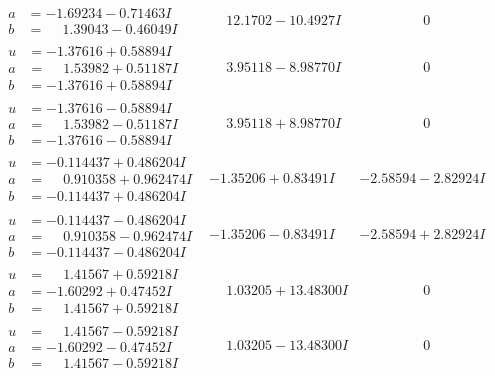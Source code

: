 \documentclass[1p]{elsarticle_modified}
\theoremstyle{definition}
\begin{document}
$$\begin{array}{c|c|c}
\begin{aligned}
a &= -1.69234 - 0.71463 I \\
b &= \phantom{-}1.39043 - 0.46049 I\end{aligned}
 & \phantom{-}12.1702 - 10.4927 I & \phantom{-0.000000 } 0 \\ \hline\begin{aligned}
u &= -1.37616 + 0.58894 I \\
a &= \phantom{-}1.53982 + 0.51187 I \\
b &= -1.37616 + 0.58894 I\end{aligned}
 & \phantom{-}3.95118 - 8.98770 I & \phantom{-0.000000 } 0 \\ \hline\begin{aligned}
u &= -1.37616 - 0.58894 I \\
a &= \phantom{-}1.53982 - 0.51187 I \\
b &= -1.37616 - 0.58894 I\end{aligned}
 & \phantom{-}3.95118 + 8.98770 I & \phantom{-0.000000 } 0 \\ \hline\begin{aligned}
u &= -0.114437 + 0.486204 I \\
a &= \phantom{-}0.910358 + 0.962474 I \\
b &= -0.114437 + 0.486204 I\end{aligned}
 & -1.35206 + 0.83491 I & -2.58594 - 2.82924 I \\ \hline\begin{aligned}
u &= -0.114437 - 0.486204 I \\
a &= \phantom{-}0.910358 - 0.962474 I \\
b &= -0.114437 - 0.486204 I\end{aligned}
 & -1.35206 - 0.83491 I & -2.58594 + 2.82924 I \\ \hline\begin{aligned}
u &= \phantom{-}1.41567 + 0.59218 I \\
a &= -1.60292 + 0.47452 I \\
b &= \phantom{-}1.41567 + 0.59218 I\end{aligned}
 & \phantom{-}1.03205 + 13.48300 I & \phantom{-0.000000 } 0 \\ \hline\begin{aligned}
u &= \phantom{-}1.41567 - 0.59218 I \\
a &= -1.60292 - 0.47452 I \\
b &= \phantom{-}1.41567 - 0.59218 I\end{aligned}
 & \phantom{-}1.03205 - 13.48300 I & \phantom{-0.000000 } 0 \\ \hline\begin{aligned}

\end{aligned}
\end{array}$$
\end{document}
